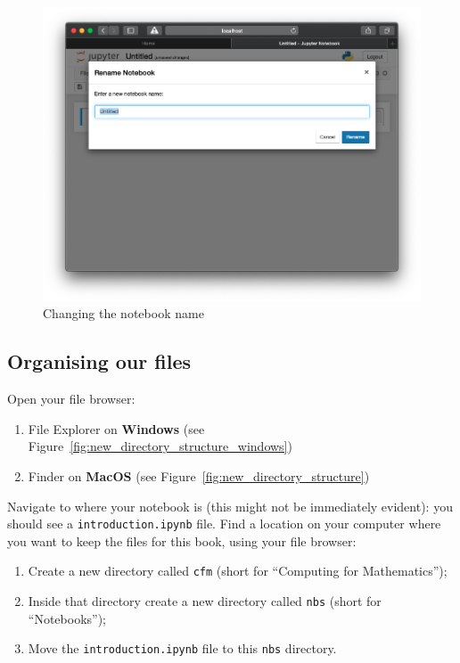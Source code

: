 \begin{figure}[htbp]
\centering
    \includegraphics[width=0.750\linewidth]{assets/changing_notebook_name/main.png}
    \caption{Changing the notebook name}
\end{figure}

\subsection{Organising our files}

Open your file browser:

\begin{enumerate}
    \item File Explorer on \textbf{Windows} (see
        Figure~\ref{fig:new_directory_structure_windows})

\item Finder on \textbf{MacOS} (see
        Figure~\ref{fig:new_directory_structure})
\end{enumerate}

Navigate to where your notebook is (this might not be immediately evident): you
should see a \texttt{introduction.ipynb} file.
Find a location on your computer where you want to keep the files for this
book, using your file browser:

\begin{enumerate}
\item Create a new directory called \texttt{cfm} (short for “Computing for Mathematics”);

\item Inside that directory create a new directory called \texttt{nbs} (short for
``Notebooks'');

\item Move the \texttt{introduction.ipynb} file to this \texttt{nbs} directory.

\end{enumerate}

